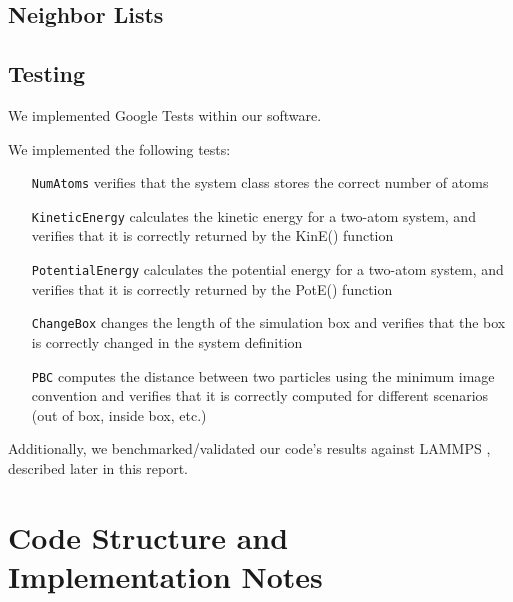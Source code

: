 \documentclass[12pt]{article}
\begin{document}
\subsection{Neighbor Lists}

\subsection{Testing}

We implemented Google Tests within our software.

We implemented the following tests:
	\begin{itemize}
	\item[\texttt{NumAtoms}] verifies that the system class stores the correct number of atoms
	\item[\texttt{KineticEnergy}] calculates the kinetic energy for a two-atom system, and verifies that it is correctly returned by the KinE() function
	\item[\texttt{PotentialEnergy}] calculates the potential energy for a two-atom system, and verifies that it is correctly returned by the PotE() function
	\item[\texttt{ChangeBox}] changes the length of the simulation box and verifies that the box is correctly changed in the system definition
	\item[\texttt{PBC}] computes the distance between two particles using the minimum image convention and verifies that it is correctly computed for different scenarios (out of box, inside box, etc.)
	\end{itemize}

Additionally, we benchmarked/validated our code's results against LAMMPS \cite{Plimpton1995}, described later in this report.

\section{Code Structure and Implementation Notes}
\end{document}
